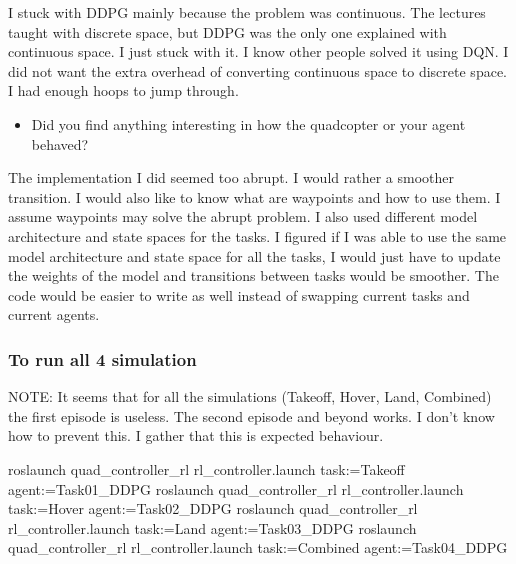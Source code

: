 \documentclass[11pt]{article}
\providecommand{\tightlist}{%
      \setlength{\itemsep}{0pt}\setlength{\parskip}{0pt}}
\newenvironment{Shaded}{}{}
\newcommand{\NormalTok}[1]{{#1}}
\newcommand{\ExtensionTok}[1]{{#1}}
\begin{document}
I stuck with DDPG mainly because the problem was continuous. The
lectures taught with discrete space, but DDPG was the only one explained
with continuous space. I just stuck with it. I know other people solved
it using DQN. I did not want the extra overhead of converting continuous
space to discrete space. I had enough hoops to jump through.

\begin{itemize}
\tightlist
\item
  Did you find anything interesting in how the quadcopter or your agent
  behaved?
\end{itemize}

The implementation I did seemed too abrupt. I would rather a smoother
transition. I would also like to know what are waypoints and how to use
them. I assume waypoints may solve the abrupt problem. I also used
different model architecture and state spaces for the tasks. I figured
if I was able to use the same model architecture and state space for all
the tasks, I would just have to update the weights of the model and
transitions between tasks would be smoother. The code would be easier to
write as well instead of swapping current tasks and current agents.

    \subsubsection{To run all 4 simulation}\label{to-run-all-4-simulation}

NOTE: It seems that for all the simulations (Takeoff, Hover, Land,
Combined) the first episode is useless. The second episode and beyond
works. I don't know how to prevent this. I gather that this is expected
behaviour.

\begin{Shaded}
\begin{Highlighting}[]
\ExtensionTok{roslaunch}\NormalTok{ quad_controller_rl rl_controller.launch task:=Takeoff agent:=Task01_DDPG}
\ExtensionTok{roslaunch}\NormalTok{ quad_controller_rl rl_controller.launch task:=Hover agent:=Task02_DDPG}
\ExtensionTok{roslaunch}\NormalTok{ quad_controller_rl rl_controller.launch task:=Land agent:=Task03_DDPG}
\ExtensionTok{roslaunch}\NormalTok{ quad_controller_rl rl_controller.launch task:=Combined agent:=Task04_DDPG}
\end{Highlighting}
\end{Shaded}


    
    
    
    
\end{document}
